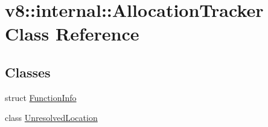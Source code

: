\hypertarget{classv8_1_1internal_1_1_allocation_tracker}{}\section{v8\+:\+:internal\+:\+:Allocation\+Tracker Class Reference}
\label{classv8_1_1internal_1_1_allocation_tracker}
\subsection*{Classes}
\begin{DoxyCompactItemize}
\item 
struct \hyperlink{structv8_1_1internal_1_1_allocation_tracker_1_1_function_info}{Function\+Info}
\item 
class \hyperlink{classv8_1_1internal_1_1_allocation_tracker_1_1_unresolved_location}{Unresolved\+Location}
\end{DoxyCompactItemize}
